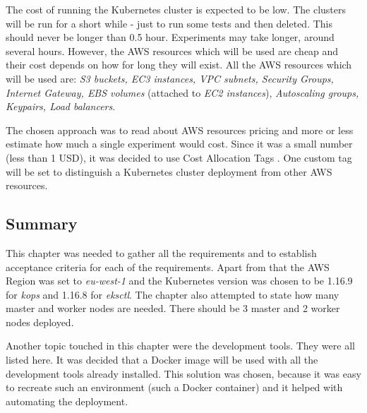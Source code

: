 The cost of running the Kubernetes cluster is expected to be low. The clusters will be run for a short while - just to run some tests and then deleted. This should never be longer than 0.5 hour. Experiments may take longer, around several hours. However, the AWS resources which will be used are cheap and their cost depends on how for long they will exist. All the AWS resources which will be used are: \textit{S3 buckets, EC3 instances, VPC subnets, Security Groups, Internet Gateway, EBS volumes} (attached to \textit{EC2 instances}), \textit{Autoscaling groups, Keypairs, Load balancers}.

The chosen approach was to read about AWS resources pricing and more or less estimate how much a single experiment would cost. Since it was a small number (less than 1 USD), it was decided to use Cost Allocation Tags \cite{amazon-cost-tags}. One custom tag will be set to distinguish a Kubernetes cluster deployment from other AWS resources.

\subsection{Summary}

This chapter was needed to gather all the requirements and to establish acceptance criteria for each of the requirements. Apart from that the AWS Region was set to \textit{eu-west-1} and the Kubernetes version was chosen to be 1.16.9 for \textit{kops} and 1.16.8 for \textit{eksctl}. The chapter also attempted to state how many master and worker nodes are needed. There should be 3 master and 2 worker nodes deployed.

Another topic touched in this chapter were the development tools. They were all listed here. It was decided that a Docker image will be used with all the development tools already installed. This solution was chosen, because it was easy to recreate such an environment (such a Docker container) and it helped with automating the deployment.

